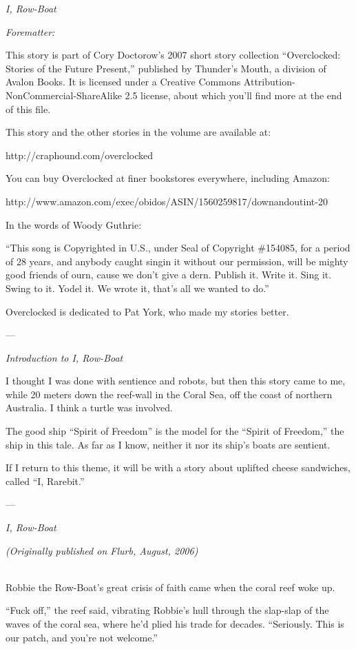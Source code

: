 \emph{I, Row-Boat}

\emph{Forematter:}

This story is part of Cory Doctorow’s 2007 short story collection
“Overclocked: Stories of the Future Present,” published by
Thunder’s Mouth, a division of Avalon Books. It is licensed under a
Creative Commons Attribution-NonCommercial-ShareAlike 2.5 license,
about which you’ll find more at the end of this file.

This story and the other stories in the volume are available at:

http://craphound.com/overclocked

You can buy Overclocked at finer bookstores everywhere, including
Amazon:

http://www.amazon.com/exec/obidos/ASIN/1560259817/downandoutint-20

In the words of Woody Guthrie:

“This song is Copyrighted in U.S., under Seal of Copyright
\#154085, for a period of 28 years, and anybody caught singin it
without our permission, will be mighty good friends of ourn, cause
we don’t give a dern. Publish it. Write it. Sing it. Swing to it.
Yodel it. We wrote it, that’s all we wanted to do.”

Overclocked is dedicated to Pat York, who made my stories better.

—

\emph{Introduction to I, Row-Boat}

I thought I was done with sentience and robots, but then this story
came to me, while 20 meters down the reef-wall in the Coral Sea,
off the coast of northern Australia. I think a turtle was
involved.

The good ship “Spirit of Freedom” is the model for the “Spirit of
Freedom,” the ship in this tale. As far as I know, neither it nor
its ship’s boats are sentient.

If I return to this theme, it will be with a story about uplifted
cheese sandwiches, called “I, Rarebit.”

—

\emph{I, Row-Boat}

\emph{(Originally published on Flurb, August, 2006)}

\\

Robbie the Row-Boat’s great crisis of faith came when the coral
reef woke up.

“Fuck off,” the reef said, vibrating Robbie’s hull through the
slap-slap of the waves of the coral sea, where he’d plied his trade
for decades. “Seriously. This is our patch, and you’re not
welcome.”

